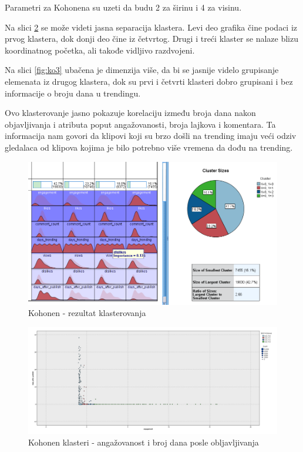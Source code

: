 \documentclass[a4paper]{article}
\theoremstyle{definition}
\begin{document}
Parametri za Kohonena su uzeti da budu 2 za širinu i 4 za visinu.


Na slici \ref{fig:ko2} se može videti jasna separacija klastera. Levi deo grafika čine podaci iz prvog klastera, dok donji deo čine iz četvrtog. Drugi i treći klaster se nalaze blizu koordinatnog početka, ali takođe vidljivo razdvojeni.

Na slici \ref{fig:ko3} ubačena je dimenzija više, da bi se jasnije videlo grupisanje elemenata iz drugog klastera, dok su prvi i četvrti klasteri dobro grupisani i bez informacije o broju dana u trendingu.

Ovo klasterovanje jasno pokazuje korelaciju između broja dana nakon objavljivanja i atributa poput angažovanosti, 
broja lajkova i komentara. Ta informacija nam govori da klipovi koji su brzo došli na trending imaju veći odziv gledalaca od
 klipova kojima je bilo potrebno više vremena da dođu na trending.


\begin{figure}[H]
\begin{center}
    \includegraphics[width=1\textwidth]{Kohonen.png}
    \caption{Kohonen - rezultat klasterovanja}
     \label{fig:ko1}
\end{center}
\end{figure}


\begin{figure}[H]
\begin{center}
    \includegraphics[width=1\textwidth]{Kohonen_engagement_days_after_publish.png}
    \caption{Kohonen klasteri - angažovanost i broj dana posle obljavljivanja}
     \label{fig:ko2}
\end{center}
\end{figure}
\end{document}

